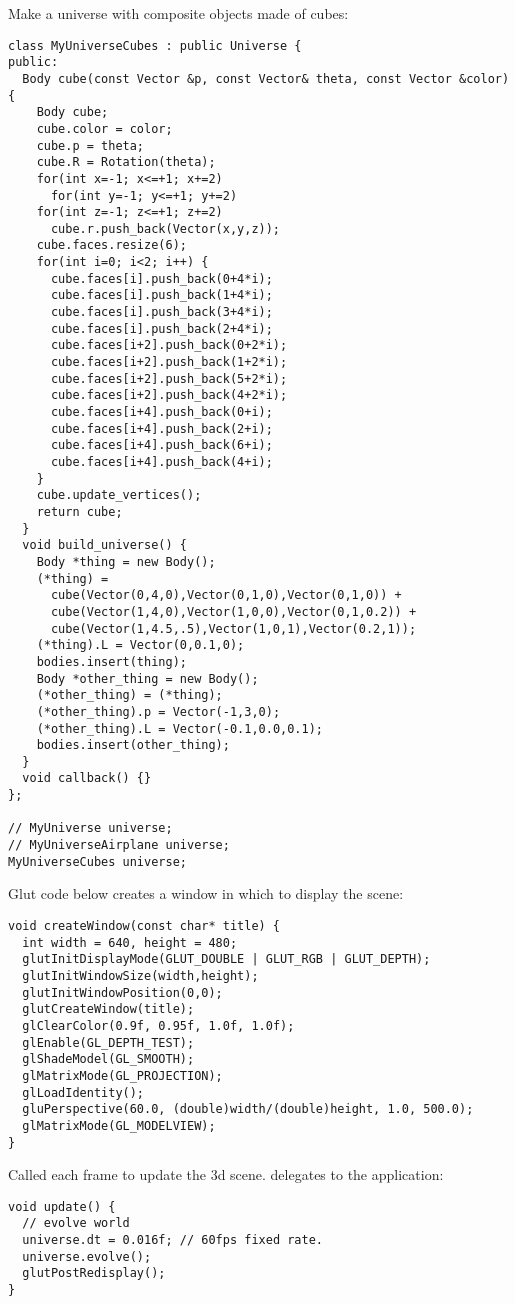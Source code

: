 \noindent
Make a universe with composite objects made of cubes: \begin{lstlisting}
class MyUniverseCubes : public Universe {
public:
  Body cube(const Vector &p, const Vector& theta, const Vector &color) {
    Body cube;
    cube.color = color;
    cube.p = theta;
    cube.R = Rotation(theta);
    for(int x=-1; x<=+1; x+=2)
      for(int y=-1; y<=+1; y+=2)
	for(int z=-1; z<=+1; z+=2)
	  cube.r.push_back(Vector(x,y,z));
    cube.faces.resize(6);    
    for(int i=0; i<2; i++) {
      cube.faces[i].push_back(0+4*i);
      cube.faces[i].push_back(1+4*i);
      cube.faces[i].push_back(3+4*i);
      cube.faces[i].push_back(2+4*i);
      cube.faces[i+2].push_back(0+2*i);
      cube.faces[i+2].push_back(1+2*i);
      cube.faces[i+2].push_back(5+2*i);
      cube.faces[i+2].push_back(4+2*i);
      cube.faces[i+4].push_back(0+i);
      cube.faces[i+4].push_back(2+i);
      cube.faces[i+4].push_back(6+i);
      cube.faces[i+4].push_back(4+i);
    }
    cube.update_vertices();
    return cube;
  }
  void build_universe() {
    Body *thing = new Body();
    (*thing) = 
      cube(Vector(0,4,0),Vector(0,1,0),Vector(0,1,0)) +
      cube(Vector(1,4,0),Vector(1,0,0),Vector(0,1,0.2)) +
      cube(Vector(1,4.5,.5),Vector(1,0,1),Vector(0.2,1));		    
    (*thing).L = Vector(0,0.1,0);    
    bodies.insert(thing);
    Body *other_thing = new Body();
    (*other_thing) = (*thing);
    (*other_thing).p = Vector(-1,3,0);
    (*other_thing).L = Vector(-0.1,0.0,0.1);
    bodies.insert(other_thing);    
  }
  void callback() {}
};

// MyUniverse universe;
// MyUniverseAirplane universe;
MyUniverseCubes universe;
\end{lstlisting}
\noindent
Glut code below
creates a window in which to display the scene: \begin{lstlisting}
void createWindow(const char* title) {
  int width = 640, height = 480;
  glutInitDisplayMode(GLUT_DOUBLE | GLUT_RGB | GLUT_DEPTH);
  glutInitWindowSize(width,height);
  glutInitWindowPosition(0,0);
  glutCreateWindow(title);
  glClearColor(0.9f, 0.95f, 1.0f, 1.0f);
  glEnable(GL_DEPTH_TEST);
  glShadeModel(GL_SMOOTH);  
  glMatrixMode(GL_PROJECTION);
  glLoadIdentity();
  gluPerspective(60.0, (double)width/(double)height, 1.0, 500.0);
  glMatrixMode(GL_MODELVIEW);
}
\end{lstlisting}
\noindent
Called each frame to update the 3d scene. delegates to
the application: \begin{lstlisting}
void update() {
  // evolve world
  universe.dt = 0.016f;	// 60fps fixed rate.
  universe.evolve();
  glutPostRedisplay();
}
\end{lstlisting}
